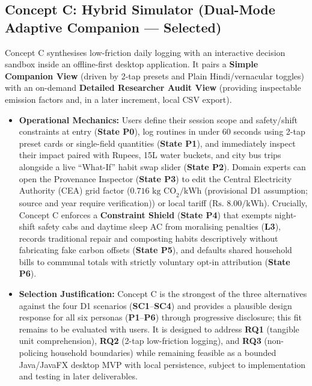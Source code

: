 \documentclass[12pt, a4paper]{article}
\begin{document}
\subsection{Concept C: Hybrid Simulator (Dual-Mode Adaptive Companion --- Selected)}
Concept C synthesises low-friction daily logging with an interactive decision sandbox inside an offline-first desktop application. It pairs a \textbf{Simple Companion View} (driven by 2-tap presets and Plain Hindi/vernacular toggles) with an on-demand \textbf{Detailed Researcher Audit View} (providing inspectable emission factors and, in a later increment, local CSV export).
\begin{itemize}
    \item \textbf{Operational Mechanics:} Users define their session scope and safety/shift constraints at entry (\textbf{State P0}), log routines in under 60 seconds using 2-tap preset cards or single-field quantities (\textbf{State P1}), and immediately inspect their impact paired with Rupees, 15L water buckets, and city bus trips alongside a live ``What-If'' habit swap slider (\textbf{State P2}). Domain experts can open the Provenance Inspector (\textbf{State P3}) to edit the Central Electricity Authority (CEA) grid factor ($0.716\text{ kg CO}_2\text{/kWh}$ (provisional D1 assumption; source and year require verification)) or local tariff ($\text{Rs. }8.00\text{/kWh}$). Crucially, Concept C enforces a \textbf{Constraint Shield} (\textbf{State P4}) that exempts night-shift safety cabs and daytime sleep AC from moralising penalties (\textbf{L3}), records traditional repair and composting habits descriptively without fabricating fake carbon offsets (\textbf{State P5}), and defaults shared household bills to communal totals with strictly voluntary opt-in attribution (\textbf{State P6}).
    \item \textbf{Selection Justification:} Concept C is the strongest of the three alternatives against the four D1 scenarios (\textbf{SC1}--\textbf{SC4}) and provides a plausible design response for all six personas (\textbf{P1}--\textbf{P6}) through progressive disclosure; this fit remains to be evaluated with users. It is designed to address \textbf{RQ1} (tangible unit comprehension), \textbf{RQ2} (2-tap low-friction logging), and \textbf{RQ3} (non-policing household boundaries) while remaining feasible as a bounded Java/JavaFX desktop MVP with local persistence, subject to implementation and testing in later deliverables.
\end{itemize}

\end{document}
